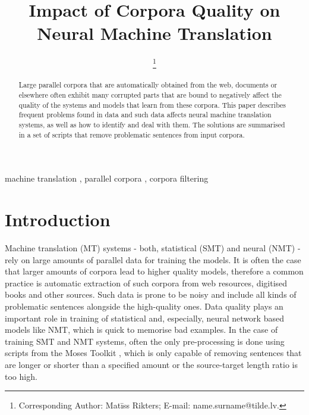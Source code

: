 \documentclass{IOS-Book-Article}
\def\hb{\hbox to 10.7 cm{}}
\begin{document}
\pagestyle{headings}
\def\thepage{}

\newcommand{\XXX}[1]{\textcolor{red}{XXX #1}}
\def\repl#1#2{\textcolor{red}{XXX \sout{#1}}\textcolor{blue}{#2}}


\begin{frontmatter}              


\title{Impact of Corpora Quality on Neural Machine Translation}

\markboth{}{September 2018\hb}

\author{
     \thanks{Corresponding Author: Matīss Rikters; E-mail: name.surname@tilde.lv.}
}

\address{Tilde, Vienības gatve 75A, Rīga, Latvia}

\begin{abstract}
    Large parallel corpora that are automatically obtained from the web, documents or elsewhere often exhibit many corrupted parts that are bound to negatively affect the quality of the systems and models that learn from these corpora. This paper describes frequent problems found in data and such data affects neural machine translation systems, as well as how to identify and deal with them. The solutions are summarised in a set of scripts that remove problematic sentences from input corpora.
\end{abstract}

\begin{keyword}
    machine translation \sep 
    parallel corpora \sep
    corpora filtering
\end{keyword}
\end{frontmatter}
\markboth{September 2018\hb}{September 2018\hb}
\thispagestyle{empty}
\pagestyle{empty}

\section{Introduction}
Machine translation (MT) systems - both, statistical (SMT) and neural (NMT) -  rely on large amounts of parallel data for training the models. It is often the case that larger amounts of corpora lead to higher quality models, therefore a common practice is automatic extraction of such corpora from web resources, digitised books and other sources. Such data is prone to be noisy and include all kinds of problematic sentences alongside the high-quality ones. Data quality plays an important role in training of statistical and, especially, neural network based models like NMT, which is quick to memorise bad examples. In the case of training SMT and NMT systems, often the only pre-processing is done using scripts from the Moses Toolkit \cite{Koehn2007Moses:Translation}, which is only capable of removing sentences that are longer or shorter than a specified amount or the source-target length ratio is too high.
\end{document}
